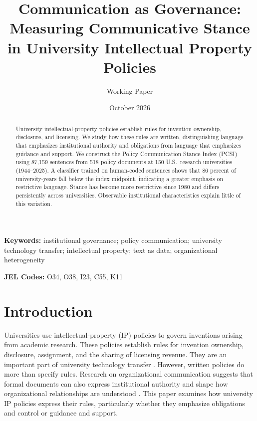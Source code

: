 \documentclass[11pt]{article}
\title{\textbf{Communication as Governance:}\\[2pt]
\textbf{Measuring Communicative Stance in University Intellectual Property Policies}}
\author{Working Paper}
\date{October 2026}
\begin{document}
\maketitle
\thispagestyle{empty}



\begin{abstract}
\noindent
University intellectual-property policies establish rules for invention ownership, disclosure, and licensing. We study how these rules are written, distinguishing language that emphasizes institutional authority and obligations from language that emphasizes guidance and support. We construct the Policy Communication Stance Index (PCSI) using 87,159 sentences from 518 policy documents at 150 U.S.\ research universities (1944--2025). A classifier trained on human-coded sentences shows that 86 percent of university-years fall below the index midpoint, indicating a greater emphasis on restrictive language. Stance has become more restrictive since 1980 and differs persistently across universities. Observable institutional characteristics explain little of this variation.
\end{abstract}


\vspace{0.8em}
\noindent\textbf{Keywords:} institutional governance; policy communication; university technology transfer; intellectual property; text as data; organizational heterogeneity

\noindent\textbf{JEL Codes:} O34, O38, I23, C55, K11




\newpage
\onehalfspacing


\section{Introduction}\label{sec:intro}

Universities use intellectual-property (IP) policies to govern inventions arising from academic research. These policies establish rules for invention ownership, disclosure, assignment, and the sharing of licensing revenue. They are an important part of university technology transfer \citep{mowery2001growth,jensen2003disclosure,sampat2006patenting}. However, written policies do more than specify rules. Research on organizational communication suggests that formal documents can also express institutional authority and shape how organizational relationships are understood \citep{cooren2004textual,fairhurst2004organizations}. This paper examines how university IP policies express their rules, particularly whether they emphasize obligations and control or guidance and support.
\end{document}
